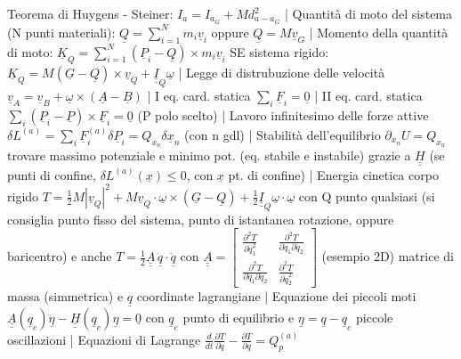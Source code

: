 \documentclass{article}
\begin{document}
Teorema di Huygens - Steiner:
$I_{a} = I_{a_{G}} + M d^{2}_{a-a_{G}}$
| Quantità di moto del sistema (N punti materiali): $\underline{Q}=\sum_{i=1}^{N}m_{i}\underline{v}_{i}$ oppure $\underline{Q}=M\underline{v}_{G}$ 
| Momento della quantità di moto:
$\underline{K}_{Q} = \sum_{i=1}^{N}(\underline{P}_{i}-\underline{Q})\times m_{i}\underline{v}_{i}$
SE sistema rigido:
$\underline{K}_{Q} = M (\underline{G}-\underline{Q})\times\underline{v}_{Q} + \underline{\underline{I}}_{Q}\underline{\omega}$
| Legge di distrubuzione delle velocità
$\underline{v}_{A} = \underline{v}_{B}+ \underline{\omega} \times (\underline{A}-\underline{B}) $
| I eq. card. statica
$\sum_{i} \underline{F}_{i} = \underline{0}$
| II eq. card. statica
$\sum_{i} (\underline{P}_{i} - \underline{P}) \times \underline{F}_{i} = \underline{0}$ (P polo scelto)
| Lavoro infinitesimo delle forze attive
$\delta L^{(a)} = \sum_{i} \underline{F}_{i}^{(a)} \delta \underline{P}_{i} = Q_{x_{n}} \delta \underline{x}_{n}$ (con n gdl)
| Stabilità dell'equilibrio 
$\partial_{x_{n}}U = Q_{x_{n}}$ trovare massimo potenziale e minimo pot. (eq. stabile e instabile) grazie a $\underline{\underline{H}}$
(se punti di confine, $\delta L^{(a)} (\underline{x}) \leq 0$, con $\underline{x}$ pt. di confine)
| Energia cinetica corpo rigido
$T = \frac{1}{2}M|\underline{v}_{Q}|^{2} + M \underline{v}_{Q} \cdot \underline{\omega} \times (\underline{G}-\underline{Q}) + \frac{1}{2} \underline{\underline{I}}_{Q}\underline{\omega} \cdot \underline{\omega}$ con Q punto qualsiasi (si consiglia punto fisso del sistema, punto di istantanea rotazione, oppure baricentro)
e anche 
$T = \frac{1}{2}\underline{\underline{A}}\, \underline{\Dot{q}}\cdot \underline{\Dot{q}}$ con $\underline{\underline{A}} = \begin{bmatrix}
\frac{\partial^2 T}{\partial \Dot{q}_1^2} & \frac{\partial^2 T}{\partial \Dot{q}_1 \partial \Dot{q}_2}\\
\frac{\partial^2 T}{\partial \Dot{q}_1 \partial \Dot{q}_2} & \frac{\partial^2 T}{\partial \Dot{q}_2^2} 
\end{bmatrix}$ (esempio 2D) matrice di massa (simmetrica) e $\underline{q}$ coordinate lagrangiane
| Equazione dei piccoli moti
$\underline{\underline{A}}(\underline{q}_{e})\underline{\ddot{\eta}}-\underline{\underline{H}}(\underline{q}_{e})\underline{\eta}=\underline{0}$ con $\underline{q}_{e}$ punto di equilibrio e $\underline{\eta}=\underline{q}-\underline{q}_e$ piccole oscillazioni
| Equazioni di Lagrange 
$\frac{d}{dt}\frac{\partial T}{\partial \Dot{q}} - \frac{\partial T}{\partial q} = Q_p^{(a)}$
\end{document}
